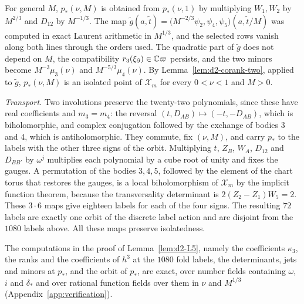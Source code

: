 For general $M$, $p_*(\nu,M)$ is obtained from $p_*(\nu,1)$ by multiplying $W_1,W_2$ by $M^{2/3}$
and $D_{12}$ by $M^{-1/3}$.  The map
$\tilde g(a,\tilde t)=\bigl(M^{-2/3}\psi_2,\psi_4,\psi_5\bigr)(a,\tilde t/M)$ was computed in
exact Laurent arithmetic in $M^{1/3}$, and the selected rows vanish along both lines through the
orders used.  The quadratic part of $\tilde g$ does not depend on $M$, the compatibility
$r_3(\xi_\partial)\in\mathbb{C}\varpi$ persists, and the two minors become $M^{-3}\mu_3(\nu)$ and
$M^{-5/3}\mu_4(\nu)$.  By Lemma~\ref{lem:d2-corank-two}, applied to $\tilde g$, $p_*(\nu,M)$ is
an isolated point of $\mathcal X_m$ for every $0<\nu<1$ and $M>0$.

\emph{Transport.}  Two involutions preserve the twenty-two polynomials, since these have real
coefficients and $m_3=m_4$: the reversal $(t,D_{AB})\mapsto(-t,-D_{AB})$, which is biholomorphic,
and complex conjugation followed by the exchange of bodies $3$ and $4$, which is
antiholomorphic.  They commute, fix $(\nu,M)$, and carry $p_*$ to the labels with the other three
signs of the orbit.  Multiplying $t$, $Z_B$, $W_A$, $D_{12}$ and $D_{BB'}$ by $\omega^j$
multiplies each polynomial by a cube root of unity and fixes the gauges.  A permutation of the
bodies $3,4,5$, followed by the element of the chart torus that restores the gauges, is a local
biholomorphism of $\mathcal X_m$ by the implicit function theorem, because the transversality
determinant is $2(Z_2-Z_1)W_5=2$.  These $3\cdot6$ maps give eighteen labels for each of the four
signs.  The resulting $72$ labels are exactly one orbit of the discrete label action and are
disjoint from the $1080$ labels above.  All these maps preserve isolatedness.

The computations in the proof of Lemma~\ref{lem:d2-L5}, namely the coefficients $\kappa_3$, the
ranks and the coefficients of $h^3$ at the $1080$ fold labels, the determinants, jets and minors
at $p_*$, and the orbit of $p_*$, are exact, over number fields containing $\omega$, $i$ and
$\delta_*$ and over rational function fields over them in $\nu$ and $M^{1/3}$
(Appendix~\ref{app:verification}).

